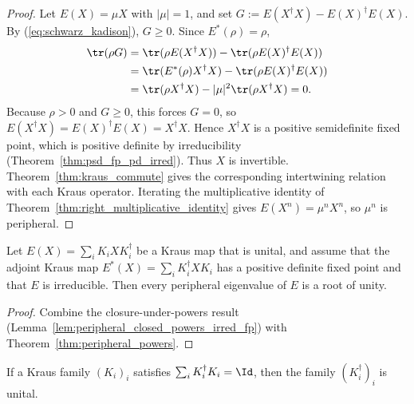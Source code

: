 \begin{proof}\leanok
    Let $E(X)=\mu X$ with $|\mu|=1$, and set
    $G:=E(X^\dagger X)-E(X)^\dagger E(X)$.
    By (\ref{eq:schwarz_kadison}), $G\geq0$.
    Since $E^*(\rho)=\rho$,
    \begin{align}
        \tr(\rho G)
         & =\tr(\rho E(X^\dagger X))
        -\tr(\rho E(X)^\dagger E(X)) \notag \\
         & =\tr(E^*(\rho)X^\dagger X)
        -\tr(\rho E(X)^\dagger E(X)) \notag \\
         & =\tr(\rho X^\dagger X)
        -|\mu|^2\tr(\rho X^\dagger X)
        =0.
    \end{align}
    Because $\rho>0$ and $G\geq0$, this forces $G=0$, so
    $E(X^\dagger X)=E(X)^\dagger E(X)=X^\dagger X$.
    Hence $X^\dagger X$ is a positive semidefinite fixed point, which is
    positive definite by irreducibility
    (Theorem~\ref{thm:psd_fp_pd_irred}). Thus $X$ is invertible.
    Theorem~\ref{thm:kraus_commute} gives the corresponding
    intertwining relation with each Kraus operator. Iterating the
    multiplicative identity of
    Theorem~\ref{thm:right_multiplicative_identity} gives
    $E(X^n)=\mu^nX^n$, so $\mu^n$ is peripheral.
\end{proof}

\begin{theorem}%
    \label{thm:peripheral_roots_irred_fp}
    \leanok
    Let $E(X)=\sum_iK_iXK_i^\dagger$ be a Kraus map that is
    unital, and assume that the adjoint Kraus map
    $E^*(X)=\sum_iK_i^\dagger XK_i$ has a positive definite fixed
    point and that $E$ is irreducible.
    Then every peripheral eigenvalue of $E$ is a root of unity.
\end{theorem}

\begin{proof}\leanok
    Combine the closure-under-powers result
    (Lemma~\ref{lem:peripheral_closed_powers_irred_fp})
    with Theorem~\ref{thm:peripheral_powers}.
\end{proof}

\begin{theorem}%
    \label{thm:unital_conjtranspose_tp}
    \leanok
    If a Kraus family $(K_i)_i$ satisfies
    $\sum_i K_i^\dagger K_i=\Id$, then the family $(K_i^\dagger)_i$ is unital.
\end{theorem}

